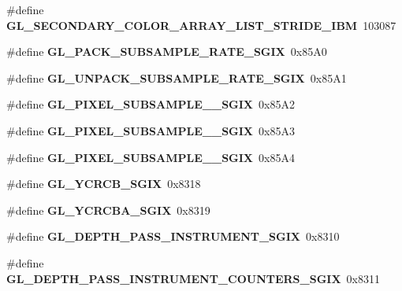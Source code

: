 \begin{DoxyCompactItemize}
\item 
\#define {\bfseries G\+L\+\_\+\+S\+E\+C\+O\+N\+D\+A\+R\+Y\+\_\+\+C\+O\+L\+O\+R\+\_\+\+A\+R\+R\+A\+Y\+\_\+\+L\+I\+S\+T\+\_\+\+S\+T\+R\+I\+D\+E\+\_\+\+I\+B\+M}~103087\label{_s_d_l__opengl_8h_a21e95f456b44c876c8747d0b8aa6b876}

\item 
\#define {\bfseries G\+L\+\_\+\+P\+A\+C\+K\+\_\+\+S\+U\+B\+S\+A\+M\+P\+L\+E\+\_\+\+R\+A\+T\+E\+\_\+\+S\+G\+I\+X}~0x85\+A0\label{_s_d_l__opengl_8h_ab9b31ba3e90ee0170807e1c6a0fe4794}

\item 
\#define {\bfseries G\+L\+\_\+\+U\+N\+P\+A\+C\+K\+\_\+\+S\+U\+B\+S\+A\+M\+P\+L\+E\+\_\+\+R\+A\+T\+E\+\_\+\+S\+G\+I\+X}~0x85\+A1\label{_s_d_l__opengl_8h_a13ddaf68b514f13f3d8944faa06a2f08}

\item 
\#define {\bfseries G\+L\+\_\+\+P\+I\+X\+E\+L\+\_\+\+S\+U\+B\+S\+A\+M\+P\+L\+E\+\_\+\_\+\+S\+G\+I\+X}~0x85\+A2\label{_s_d_l__opengl_8h_aacb2ebe7c1e9760f7cf131c823b56c97}

\item 
\#define {\bfseries G\+L\+\_\+\+P\+I\+X\+E\+L\+\_\+\+S\+U\+B\+S\+A\+M\+P\+L\+E\+\_\+\_\+\+S\+G\+I\+X}~0x85\+A3\label{_s_d_l__opengl_8h_af27edba1fa57cea900c5d3b24227418f}

\item 
\#define {\bfseries G\+L\+\_\+\+P\+I\+X\+E\+L\+\_\+\+S\+U\+B\+S\+A\+M\+P\+L\+E\+\_\+\_\+\+S\+G\+I\+X}~0x85\+A4\label{_s_d_l__opengl_8h_adb5e7feb552687419bb0df525557b655}

\item 
\#define {\bfseries G\+L\+\_\+\+Y\+C\+R\+C\+B\+\_\+\+S\+G\+I\+X}~0x8318\label{_s_d_l__opengl_8h_ae8a2ad5a5b7d0ea38cf406dd49ca199d}

\item 
\#define {\bfseries G\+L\+\_\+\+Y\+C\+R\+C\+B\+A\+\_\+\+S\+G\+I\+X}~0x8319\label{_s_d_l__opengl_8h_a48d77f55bf86b57069819f0557986a54}

\item 
\#define {\bfseries G\+L\+\_\+\+D\+E\+P\+T\+H\+\_\+\+P\+A\+S\+S\+\_\+\+I\+N\+S\+T\+R\+U\+M\+E\+N\+T\+\_\+\+S\+G\+I\+X}~0x8310\label{_s_d_l__opengl_8h_a5b2f8de2d490251b8b3d16f220a48cdc}

\item 
\#define {\bfseries G\+L\+\_\+\+D\+E\+P\+T\+H\+\_\+\+P\+A\+S\+S\+\_\+\+I\+N\+S\+T\+R\+U\+M\+E\+N\+T\+\_\+\+C\+O\+U\+N\+T\+E\+R\+S\+\_\+\+S\+G\+I\+X}~0x8311\label{_s_d_l__opengl_8h_aa94a73218c8abf2abce11b4c5e9dec53}


\end{DoxyCompactItemize}
